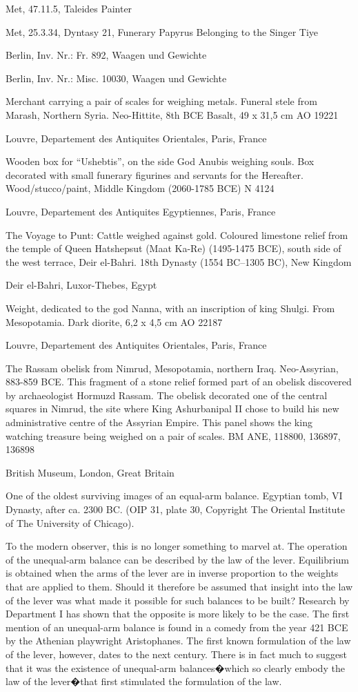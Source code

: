 \documentclass{article}
\begin{document}
Met, 47.11.5, Taleides Painter

Met, 25.3.34, Dyntasy 21, Funerary Papyrus Belonging to the Singer Tiye

Berlin, Inv. Nr.: Fr. 892, Waagen und Gewichte 

Berlin, Inv. Nr.: Misc. 10030, Waagen und Gewichte 

Merchant carrying a pair of scales for weighing metals. Funeral stele from Marash, Northern Syria. Neo-Hittite, 8th BCE Basalt, 49 x 31,5 cm AO 19221 

Louvre, Departement des Antiquites Orientales, Paris, France


Wooden box for ``Ushebtis'', on the side God Anubis weighing souls. Box decorated with small funerary figurines and servants for the Hereafter. Wood/stucco/paint, Middle Kingdom (2060-1785 BCE) N 4124 

Louvre, Departement des Antiquites Egyptiennes, Paris, France

The Voyage to Punt: Cattle weighed against gold. Coloured limestone relief from the temple of Queen Hatshepsut (Maat Ka-Re) (1495-1475 BCE), south side of the west terrace, Deir el-Bahri. 18th Dynasty (1554 BC--1305 BC), New Kingdom 

Deir el-Bahri, Luxor-Thebes, Egypt

Weight, dedicated to the god Nanna, with an inscription of king Shulgi. From Mesopotamia. Dark diorite, 6,2 x 4,5 cm AO 22187 

Louvre, Departement des Antiquites Orientales, Paris, France

The Rassam obelisk from Nimrud, Mesopotamia, northern Iraq. Neo-Assyrian, 883-859 BCE. This fragment of a stone relief formed part of an obelisk discovered by archaeologist Hormuzd Rassam. The obelisk decorated one of the central squares in Nimrud, the site where King Ashurbanipal II chose to build his new administrative centre of the Assyrian Empire. This panel shows the king watching treasure being weighed on a pair of scales. BM ANE, 118800,
136897, 136898 

British Museum, London, Great Britain

One of the oldest surviving images of an equal-arm balance. Egyptian tomb, VI Dynasty, after ca. 2300 BC. (OIP 31, plate 30, Copyright The Oriental Institute of The University of Chicago).

To the modern observer, this is no longer something to marvel at. The operation of the unequal-arm balance can be described by the law of the lever. Equilibrium is obtained when the arms of the lever are in inverse proportion to the weights that are applied to them. Should it therefore be assumed that insight into the law of the lever was what made it possible for such balances to be built? Research by Department I has shown that the opposite is more likely to be the case. The first mention of an unequal-arm balance is found in a comedy from the year 421 BCE by the Athenian playwright Aristophanes. The first known formulation of the law of the lever, however, dates to the next century. There is in fact much to suggest that it was the existence of unequal-arm balances�which so clearly embody the law of the lever�that first stimulated the formulation of the law.
\end{document}

